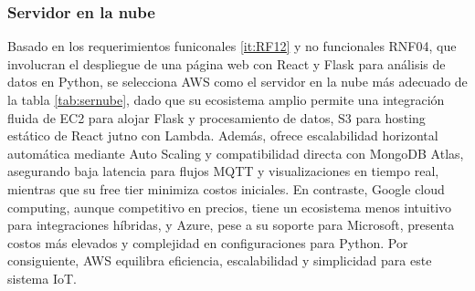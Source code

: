 \endgroup

\subsubsection{Servidor en la nube}
Basado en los requerimientos funiconales \ref{it:RF12} y no funcionales RNF04, que involucran el despliegue de una página web con React y Flask
para análisis de datos en Python, se selecciona AWS como el servidor en la nube más adecuado de la tabla
\cref{tab:sernube}, dado que su 
ecosistema amplio permite una integración fluida de EC2 para alojar Flask y procesamiento de datos, 
S3 para hosting estático de React jutno con Lambda. Además, 
ofrece escalabilidad horizontal automática mediante Auto Scaling y compatibilidad directa con MongoDB Atlas,
asegurando baja latencia para flujos MQTT y visualizaciones en tiempo real, mientras que su free tier 
minimiza costos iniciales. En contraste, Google cloud computing, 
aunque competitivo en precios, tiene un ecosistema menos intuitivo para integraciones híbridas, y Azure, pese a su soporte para Microsoft, presenta costos más elevados y complejidad en configuraciones para Python. Por consiguiente, AWS equilibra eficiencia, escalabilidad y simplicidad para este sistema IoT.


\begingroup
\setlength{\tabcolsep}{4pt} 
\renewcommand{\arraystretch}{1.6} 
\footnotesize %

